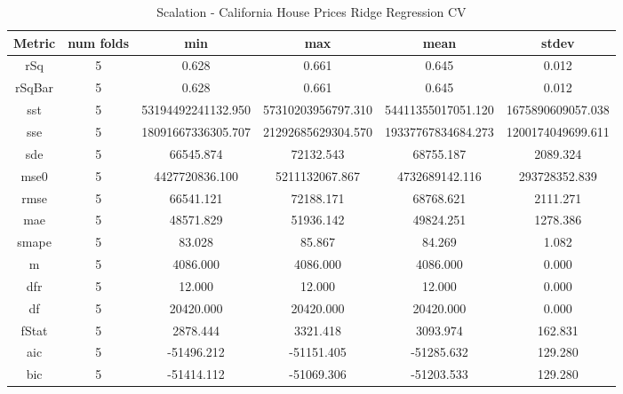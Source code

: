 \documentclass{article}
\begin{document}
\begin{table}[H]
\centering
\caption{Scalation - California House Prices Ridge Regression CV}
\label{tab:Scalation - California House Prices Ridge Regression CV}
\begin{tabular}{|c|c|c|c|c|c|}\hline
Metric & num folds & min & max & mean & stdev \\ \hline \hline
rSq & 5 & 0.628 & 0.661 & 0.645 & 0.012 \\ \hline
rSqBar & 5 & 0.628 & 0.661 & 0.645 & 0.012 \\ \hline
sst & 5 & 53194492241132.950 & 57310203956797.310 & 54411355017051.120 & 1675890609057.038 \\ \hline
sse & 5 & 18091667336305.707 & 21292685629304.570 & 19337767834684.273 & 1200174049699.611 \\ \hline
sde & 5 & 66545.874 & 72132.543 & 68755.187 & 2089.324 \\ \hline
mse0 & 5 & 4427720836.100 & 5211132067.867 & 4732689142.116 & 293728352.839 \\ \hline
rmse & 5 & 66541.121 & 72188.171 & 68768.621 & 2111.271 \\ \hline
mae & 5 & 48571.829 & 51936.142 & 49824.251 & 1278.386 \\ \hline
smape & 5 & 83.028 & 85.867 & 84.269 & 1.082 \\ \hline
m & 5 & 4086.000 & 4086.000 & 4086.000 & 0.000 \\ \hline
dfr & 5 & 12.000 & 12.000 & 12.000 & 0.000 \\ \hline
df & 5 & 20420.000 & 20420.000 & 20420.000 & 0.000 \\ \hline
fStat & 5 & 2878.444 & 3321.418 & 3093.974 & 162.831 \\ \hline
aic & 5 & -51496.212 & -51151.405 & -51285.632 & 129.280 \\ \hline
bic & 5 & -51414.112 & -51069.306 & -51203.533 & 129.280 \\ \hline
\end{tabular}
\end{table}
\end{document}
